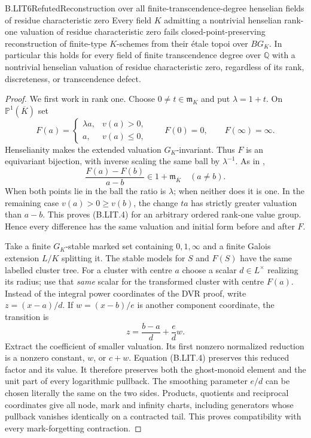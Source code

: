 \begin{claim}{B.LIT6}{Refuted}{Reconstruction over all finite-transcendence-degree henselian fields of residue characteristic zero}
Every field $K$ admitting a nontrivial henselian rank-one valuation
of residue characteristic zero fails closed-point-preserving
reconstruction of finite-type $K$-schemes from their \'etale topoi
over $BG_K$. In particular this holds for every field of finite
transcendence degree over $\mathbb Q$ with a nontrivial henselian
valuation of residue characteristic zero, regardless of its rank,
discreteness, or transcendence defect.
\end{claim}
\begin{proof}
We first work in rank one. Choose $0\ne t\in\mathfrak m_K$ and
put $\lambda=1+t$. On $\mathbb P^1(\overline K)$ set
\[
 F(a)=\begin{cases}\lambda a,&v(a)>0,\\a,&v(a)\leq0,\end{cases}
 \qquad F(0)=0,\qquad F(\infty)=\infty.
                                                        \tag{B.LIT.3}
\]
Henselianity makes the extended valuation $G_K$-invariant.
Thus $F$ is an equivariant bijection, with inverse scaling the
same ball by $\lambda^{-1}$. As in ,
\[
       \frac{F(a)-F(b)}{a-b}\in1+\mathfrak m_{\overline K}
       \quad(a\ne b).                                  \tag{B.LIT.4}
\]
When both points lie in the ball the ratio is $\lambda$; when
neither does it is one. In the remaining case
$v(a)>0\geq v(b)$, the change $ta$ has strictly greater
valuation than $a-b$. This proves (B.LIT.4) for an arbitrary
ordered rank-one value group. Hence every difference has the same
valuation and initial form before and after $F$.

Take a finite $G_K$-stable marked set containing $0,1,\infty$
and a finite Galois extension $L/K$ splitting it. The stable
models for $S$ and $F(S)$ have the same labelled cluster tree.
For a cluster with centre $a$ choose a scalar $d\in L^\times$
realizing its radius; use that \emph{same} scalar for the
transformed cluster with centre $F(a)$. Instead of the integral
power coordinates of the DVR proof, write $z=(x-a)/d$. If
$w=(x-b)/e$ is another component coordinate, the transition is
\[
                  z=\frac{b-a}{d}+\frac ed w.            \tag{B.LIT.5}
\]
Extract the coefficient of smaller valuation. Its first nonzero
normalized reduction is a nonzero constant, $w$, or $c+w$.
Equation (B.LIT.4) preserves this reduced factor and its value.
It therefore preserves both the ghost-monoid element and the
unit part of every logarithmic pullback. The smoothing parameter
$e/d$ can be chosen literally the same on the two sides.
Products, quotients and reciprocal coordinates give all node,
mark and infinity charts, including generators whose pullback
vanishes identically on a contracted tail. This proves
compatibility with every mark-forgetting contraction.


\end{proof}

